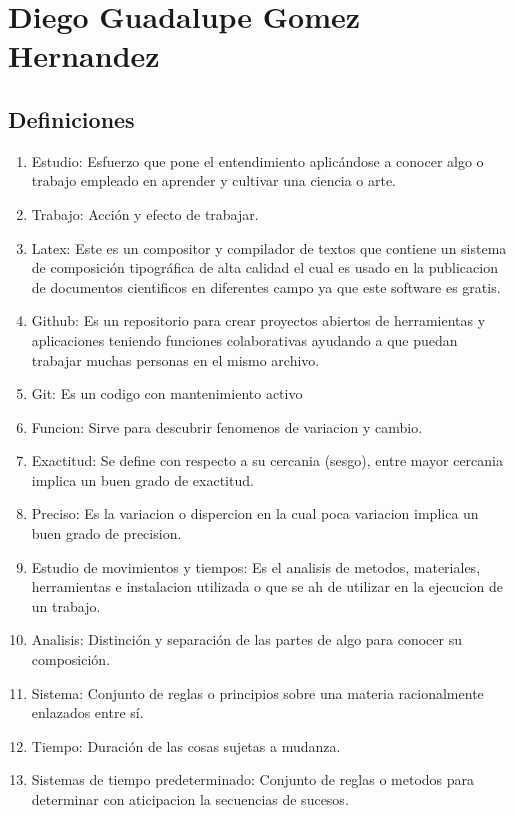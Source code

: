 \section{Diego Guadalupe Gomez Hernandez}
\subsection{Definiciones}

\begin{enumerate}
    \item Estudio: Esfuerzo que pone el entendimiento aplicándose a conocer algo o   trabajo empleado en aprender y cultivar una ciencia o arte.
    \cite{DiapositivasSema-2-21}
    \item Trabajo: Acción y efecto de trabajar.
    \cite{DiapositivasSema-2-21}
    \item Latex: Este es un compositor y compilador de textos que contiene un sistema de composición tipográfica de alta calidad el cual es usado en la publicacion de documentos cientificos en diferentes campo ya que este software es gratis.
    \cite{brys2019tesis}
    \item Github: Es un repositorio  para crear proyectos abiertos de herramientas y aplicaciones teniendo funciones colaborativas ayudando a que puedan trabajar muchas personas en el mismo archivo. 
    \cite{yúbalfernández_2019}
    \item Git: Es un codigo con mantenimiento activo
    \cite{astigarraga2022se}
    \item Funcion: Sirve para descubrir fenomenos de variacion y cambio.
    \item Exactitud: Se define con respecto a su cercania (sesgo), entre mayor cercania implica un buen grado de exactitud.  
    \item Preciso: Es la variacion o dispercion en la cual poca variacion implica un buen grado de precision.
    \item Estudio de movimientos y tiempos: Es el analisis de metodos, materiales, herramientas e instalacion utilizada o que se ah de utilizar en la ejecucion de un trabajo.
    \item Analisis: Distinción y separación de las partes de algo para conocer su composición.
    \cite{RAE2023}
    \item Sistema: Conjunto de reglas o principios sobre una materia racionalmente enlazados entre sí.
    \cite{asale_rae_2023}
    \item Tiempo: Duración de las cosas sujetas a mudanza.
    \item Sistemas de tiempo predeterminado: Conjunto de reglas o metodos para determinar con aticipacion la secuencias de sucesos.

\end{enumerate}
